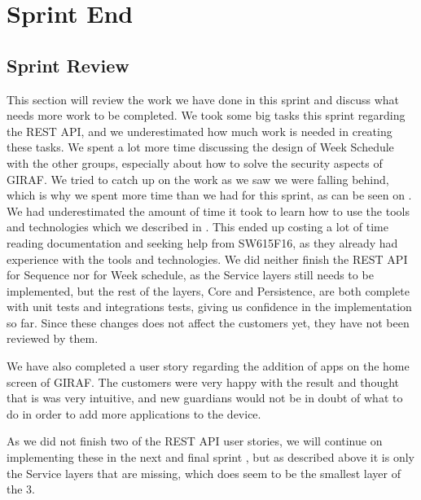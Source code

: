 \chapter{Sprint End}
\section{Sprint Review}\label{sec:sprintreview3}
This section will review the work we have done in this sprint and discuss what needs more work to be completed.
We took some big tasks this sprint regarding the REST API, and we underestimated how much work is needed in creating these tasks.
We spent a lot more time discussing the design of Week Schedule with the other groups, especially about how to solve the security aspects of GIRAF. 
We tried to catch up on the work as we saw we were falling behind, which is why we spent more time than we had for this sprint, as can be seen on .
We had underestimated the amount of time it took to learn how to use the tools and technologies which we described in .
This ended up costing a lot of time reading documentation and seeking help from SW615F16, as they already had experience with the tools and technologies.
We did neither finish the REST API for Sequence nor for Week schedule, as the Service layers still needs to be implemented, but the rest of the layers, Core and Persistence, are both complete with unit tests and integrations tests, giving us confidence in the implementation so far. 
Since these changes does not affect the customers yet, they have not been reviewed by them.

We have also completed a user story regarding the addition of apps on the home screen of GIRAF.
The customers were very happy with the result and thought that is was very intuitive, and new guardians would not be in doubt of what to do in order to add more applications to the device.

As we did not finish two of the REST API user stories, we will continue on implementing these in the next and final sprint , but as described above it is only the Service layers that are missing, which does seem to be the smallest layer of the 3.

